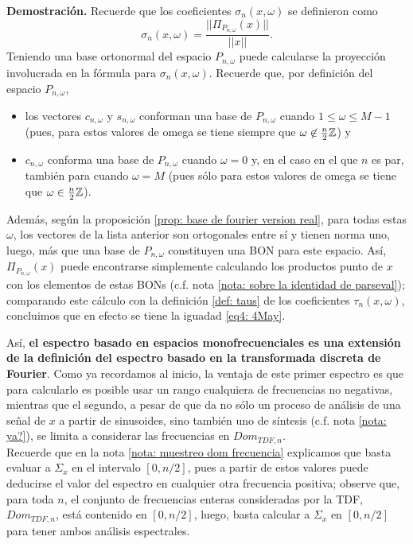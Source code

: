 \noindent
\textbf{Demostración.}
Recuerde que los coeficientes
$\sigma_{n}(x, \omega)$
se definieron como
\[
\sigma_{n}(x, \omega) = \frac{|| \Pi_{P_{n, \omega}}(x) ||}{|| x ||}.
\]
Teniendo una base ortonormal del espacio 
$P_{n, \omega}$ puede calcularse la proyección involucrada en la fórmula
para $\sigma_{n}(x, \omega)$.
Recuerde que, por definición del espacio $P_{n, \omega}$,
\begin{itemize}
	\item los vectores $c_{n, \omega}$ y $s_{n, \omega}$ conforman
	una base de $P_{n, \omega}$ cuando $1 \leq \omega \leq M-1$ 
	(pues, para estos valores de omega se tiene siempre
	que $\omega \not\in \frac{n}{2} \mathbb{Z}$) y
	\item $c_{n, \omega}$ conforma una base 
	de $P_{n, \omega}$ cuando $\omega = 0$ y,
	en el caso en el que $n$ es par, también para cuando $\omega = M$
	(pues sólo para estos valores de omega se tiene 
	que $\omega \in \frac{n}{2} \mathbb{Z}$).
\end{itemize}
Además, según la proposición
\ref{prop: base de fourier version real},
para todas estas $\omega$,
los vectores de la lista anterior son ortogonales entre
sí y tienen norma uno, luego, más que una base de 
$P_{n, \omega}$ constituyen una BON para este espacio.
Así, $\Pi_{P_{n, \omega}}(x)$ puede encontrarse 
simplemente calculando los productos punto 
de $x$ con los elementos de estas BONs (c.f. 
nota \ref{nota: sobre la identidad de parseval});
comparando este cálculo con la definición 
\ref{def: taus}
de los coeficientes $\tau_{n}(x, \omega)$,
concluimos que en efecto se
tiene la iguadad \eqref{eq4: 4May}.

\QEDB
\vspace{0.2cm}

Así, \textbf{el espectro basado en espacios monofrecuenciales
es una extensión de la definición del espectro 
basado en la transformada discreta de Fourier}.
Como ya recordamos al inicio, la
ventaja de este primer espectro es que para calcularlo es posible usar
un rango cualquiera de frecuencias no negativas, mientras que el segundo, 
a pesar de que da no sólo un proceso de análisis de una señal 
de $x$ a partir de sinusoides, sino también uno de síntesis
(c.f. nota \ref{nota: ya?}), se limita a considerar las frecuencias 
en $Dom_{TDF, n}$. \\

Recuerde que en la nota 
\ref{nota: muestreo dom frecuencia} explicamos que 
basta evaluar a $\Sigma_{x}$ en el intervalo $[0, n/2]$, 
pues a partir de estos valores puede deducirse el valor
del espectro en cualquier otra frecuencia positiva; observe que,
para toda $n$, el conjunto de frecuencias enteras 
consideradas por la TDF, $Dom_{TDF, n}$, está
contenido en $[0, n/2]$, luego, basta calcular 
a $\Sigma_{x}$ en $[0, n/2]$
para tener ambos análisis espectrales.


